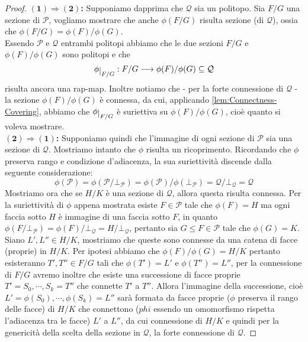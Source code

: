 \documentclass[a4paper,12pt]{report}
\newcommand{\p}{\mathcal{P}}
\theoremstyle{plain}
\theoremstyle{definition}
\newcommand\implication[2]{$\bm{(#1)\Rightarrow(#2)}$\textbf{: }}
\def\restrict#1{\raise-.5ex\hbox{\ensuremath|}_{#1}}
\begin{document}
\begin{proof}
\implication{1}{2}Supponiamo dapprima che $\mathcal{Q}$ sia un politopo. Sia $F/G$ una sezione di $\p$, vogliamo mostrare che anche $\phi(F/G)$
risulta sezione (di $\mathcal{Q}$), ossia che $\phi(F/G)=\phi(F)/\phi(G)$.\\
Essendo $\p$ e $\mathcal{Q}$ entrambi politopi abbiamo che le due sezioni $F/G$ e $\phi(F)/\phi(G)$ sono politopi e che
\begin{equation*}
\phi\restrict{F/G}:F/G\longrightarrow\phi(F)/\phi(G)\subseteq\mathcal{Q}
\end{equation*}
risulta ancora una rap-map. Inoltre notiamo che - per la forte connessione di $\mathcal{Q}$ - la sezione $\phi(F)/\phi(G)$ \`e connessa, da cui,
applicando \ref{lem:Connectness-Covering}, abbiamo che $\phi\restrict{F/G}$ \`e suriettiva su $\phi(F)/\phi(G)$, cio\`e quanto si voleva mostrare.\\
\implication{2}{1}Supponiamo quindi che l'immagine di ogni sezione di $\p$ sia una sezione di $\mathcal{Q}$. Mostriamo intanto che $\phi$ risulta
un ricoprimento. Ricordando che $\phi$ preserva rango e condizione d'adiacenza, la sua suriettivit\`a discende dalla seguente considerazione:
\begin{equation*}
\phi(\p)=\phi(\p/\bot_\p)=\phi(\p)/\phi(\bot_\p)=\mathcal{Q}/\bot_\mathcal{Q}=\mathcal{Q}
\end{equation*}
Mostriamo ora che se $H/K$ \`e una sezione di $\mathcal{Q}$, allora questa risulta connessa. Per la suriettivit\`a di $\phi$ appena mostrata
esiste $F\in\p$ tale che $\phi(F)=H$ ma ogni faccia sotto $H$ \`e immagine di una faccia sotto $F$,
in quanto $\phi(F/\bot_\p)=\phi(F)/\bot_\mathcal{Q}=H/\bot_\mathcal{Q}$, pertanto sia $G\leq F\in\p$ tale che $\phi(G)=K$.\\
Siano $L',L''\in H/K$, mostriamo che queste sono connesse da una catena di facce (proprie) in $H/K$. Per ipotesi abbiamo che
$\phi(F)/\phi(G)=H/K$ pertanto esisteranno $T',T''\in F/G$ tali che $\phi(T')=L'$ e $\phi(T'')=L''$, per la connessione di $F/G$ avremo inoltre che
esiste una successione di facce proprie $T'=S_0,\cdots,S_k=T''$ che connette $T'$ a $T''$. Allora l'immagine della successione, cio\`e
$L'=\phi(S_0),\cdots,\phi(S_k)=L''$ sar\`a formata da facce proprie ($\phi$ preserva il rango delle facce) di $H/K$ che connettono
($phi$ essendo un omomorfismo rispetta l'adiacenza tra le facce) $L'$ a $L''$, da cui connessione di $H/K$ e quindi per la genericit\`a della scelta
della sezione in $\mathcal{Q}$, la forte connessione di $\mathcal{Q}$.
\end{proof}
\end{document}
